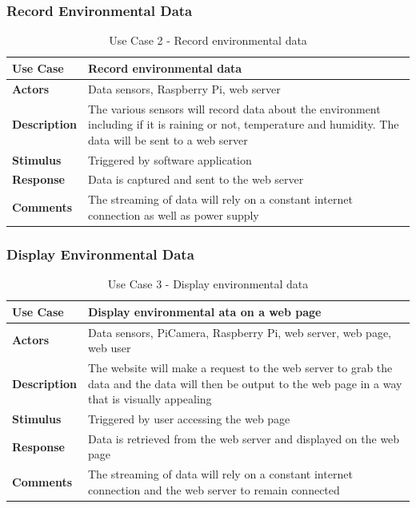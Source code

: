\documentclass[10pt,a4paper]{article}
\begin{document}
\subsubsection{Record Environmental Data}
\begin{table}[h!]
\centering
\begin{tabular}{p{2cm}p{9cm}}
\toprule
\textbf{Use Case}    & Record environmental data                                                                          \\ \midrule
\textbf{Actors}      & Data sensors, Raspberry Pi, web server                                                                          \\
\textbf{Description} & The various sensors will record data about the environment including if it is raining or not, temperature and humidity. The data will be sent to a web server         \\
\textbf{Stimulus}    & Triggered by software application\\
\textbf{Response}    & Data is captured and sent to the web server              \\
\textbf{Comments}    & The streaming of data will rely on a constant internet connection as well as power supply \\ \bottomrule
\end{tabular}
\caption{Use Case 2 - Record environmental data}
\label{tab:useCase1}
\end{table}

\subsubsection{Display Environmental Data}
\begin{table}[h!]
\centering
\begin{tabular}{p{2cm}p{9cm}}
\toprule
\textbf{Use Case}    & Display environmental ata on a web page \\ \midrule
\textbf{Actors}      & Data sensors, PiCamera, Raspberry Pi, web server, web page, web user                                                                          \\
\textbf{Description} & The website will make a request to the web server to grab the data and the data will then be output to the web page in a way that is visually appealing         \\
\textbf{Stimulus}    & Triggered by user accessing the web page\\
\textbf{Response}    & Data is retrieved from the web server and displayed on the web page              \\
\textbf{Comments}    & The streaming of data will rely on a constant internet connection and the web server to remain connected \\ \bottomrule
\end{tabular}
\caption{Use Case 3 - Display environmental data}
\label{tab:useCase3}
\end{table}
\end{document}

